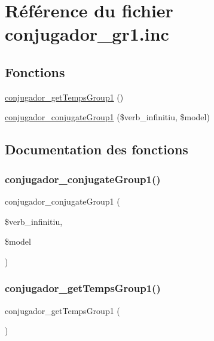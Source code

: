 \hypertarget{conjugador__gr1_8inc}{}\section{Référence du fichier conjugador\+\_\+gr1.\+inc}
\label{conjugador__gr1_8inc}
\subsection*{Fonctions}
\begin{DoxyCompactItemize}
\item 
\hyperlink{conjugador__gr1_8inc_a3bf48675f6020dac50d8c00a36a697ab}{conjugador\+\_\+get\+Temps\+Group1} ()
\item 
\hyperlink{conjugador__gr1_8inc_aaaea7cba73e7edd4322fe06a04c16892}{conjugador\+\_\+conjugate\+Group1} (\$verb\+\_\+infinitiu, \$model)
\end{DoxyCompactItemize}


\subsection{Documentation des fonctions}
\hypertarget{conjugador__gr1_8inc_aaaea7cba73e7edd4322fe06a04c16892}{}\label{conjugador__gr1_8inc_aaaea7cba73e7edd4322fe06a04c16892} 
\subsubsection{\texorpdfstring{conjugador\+\_\+conjugate\+Group1()}{conjugador\_conjugateGroup1()}}
{\footnotesize\ttfamily conjugador\+\_\+conjugate\+Group1 (\begin{DoxyParamCaption}\item[{}]{\$verb\+\_\+infinitiu,  }\item[{}]{\$model }\end{DoxyParamCaption})}

\hypertarget{conjugador__gr1_8inc_a3bf48675f6020dac50d8c00a36a697ab}{}\label{conjugador__gr1_8inc_a3bf48675f6020dac50d8c00a36a697ab} 
\subsubsection{\texorpdfstring{conjugador\+\_\+get\+Temps\+Group1()}{conjugador\_getTempsGroup1()}}
{\footnotesize\ttfamily conjugador\+\_\+get\+Temps\+Group1 (\begin{DoxyParamCaption}{ }\end{DoxyParamCaption})}

